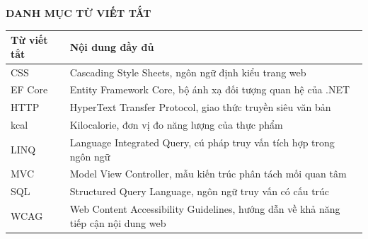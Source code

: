 \clearpage
{}
{}
\renewcommand{\contentsname}{MỤC LỤC}
{\tableofcontents}

\clearpage
{}
{}
\renewcommand{\listfigurename}{DANH MỤC HÌNH ẢNH}
{\listoffigures}

\clearpage
{}
{}
\renewcommand{\listtablename}{DANH MỤC BẢNG BIỂU}
{\listoftables}

\clearpage
{}
{}
\begin{center}
{\fontsize{14}{21}\selectfont\bfseries DANH MỤC TỪ VIẾT TẮT}
\end{center}
\vspace{6pt}

\begin{longtable}{|P{2.6cm}|P{11.4cm}|}
\hline
\bfseries Từ viết tắt & \bfseries Nội dung đầy đủ \\ \hline
\endhead
\endfoot
CSS   & Cascading Style Sheets, ngôn ngữ định kiểu trang web \\ \hline
EF Core & Entity Framework Core, bộ ánh xạ đối tượng quan hệ của .NET \\ \hline
HTTP  & HyperText Transfer Protocol, giao thức truyền siêu văn bản \\ \hline
kcal  & Kilocalorie, đơn vị đo năng lượng của thực phẩm \\ \hline
LINQ  & Language Integrated Query, cú pháp truy vấn tích hợp trong ngôn ngữ \\ \hline
MVC   & Model View Controller, mẫu kiến trúc phân tách mối quan tâm \\ \hline
SQL   & Structured Query Language, ngôn ngữ truy vấn có cấu trúc \\ \hline
WCAG  & Web Content Accessibility Guidelines, hướng dẫn về khả năng tiếp cận
        nội dung web \\ \hline
\end{longtable}
